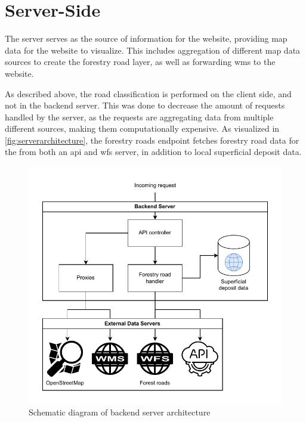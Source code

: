 \section{Server-Side}

The server serves as the source of information for the website, providing map data for the website to visualize. This includes aggregation of different map data sources to create the forestry road layer, as well as forwarding \gls{wms} to the website.

As described above, the road classification is performed on the client side, and not in the backend server. This was done to decrease the amount of requests handled by the server, as the requests are aggregating data from multiple different sources, making them computationally expensive. As visualized in \autoref{fig:serverarchitecture}, the forestry roads endpoint fetches forestry road data for the from both an \acrshort{api} and \acrshort{wfs} server, in addition to local superficial deposit data.

\begin{figure}[h]
    \centering
    \centerline{\includegraphics[width=1\linewidth]{figures/server.pdf}}
    \caption{Schematic diagram of backend server architecture}
    \label{fig:serverarchitecture}
\end{figure}

